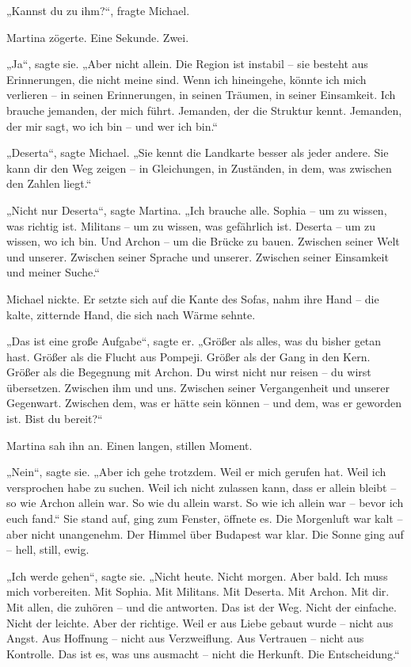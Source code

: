 \documentclass[
]{article}
\begin{document}
„Kannst du zu ihm?{\kern0pt}``, fragte Michael.

Martina zögerte. Eine Sekunde. Zwei.

„Ja``, sagte sie. „Aber nicht allein. Die Region ist instabil -- sie besteht aus Erinnerungen, die nicht meine sind. Wenn ich hineingehe, könnte ich mich verlieren -- in seinen Erinnerungen, in seinen Träumen, in seiner Einsamkeit. Ich brauche jemanden, der mich führt. Jemanden, der die Struktur kennt. Jemanden, der mir sagt, wo ich bin -- und wer ich bin.``

„Deserta``, sagte Michael. „Sie kennt die Landkarte besser als jeder andere. Sie kann dir den Weg zeigen -- in Gleichungen, in Zuständen, in dem, was zwischen den Zahlen liegt.``

„Nicht nur Deserta``, sagte Martina. „Ich brauche alle. Sophia -- um zu wissen, was richtig ist. Militans -- um zu wissen, was gefährlich ist. Deserta -- um zu wissen, wo ich bin. Und Archon -- um die Brücke zu bauen. Zwischen seiner Welt und unserer. Zwischen seiner Sprache und unserer. Zwischen seiner Einsamkeit und meiner Suche.``

Michael nickte. Er setzte sich auf die Kante des Sofas, nahm ihre Hand -- die kalte, zitternde Hand, die sich nach Wärme sehnte.

„Das ist eine große Aufgabe``, sagte er. „Größer als alles, was du bisher getan hast. Größer als die Flucht aus Pompeji. Größer als der Gang in den Kern. Größer als die Begegnung mit Archon. Du wirst nicht nur reisen -- du wirst übersetzen. Zwischen ihm und uns. Zwischen seiner Vergangenheit und unserer Gegenwart. Zwischen dem, was er hätte sein können -- und dem, was er geworden ist. Bist du bereit?{\kern0pt}``

Martina sah ihn an. Einen langen, stillen Moment.

„Nein``, sagte sie. „Aber ich gehe trotzdem. Weil er mich gerufen hat. Weil ich versprochen habe zu suchen. Weil ich nicht zulassen kann, dass er allein bleibt -- so wie Archon allein war. So wie du allein warst. So wie ich allein war -- bevor ich euch fand.`` Sie stand auf, ging zum Fenster, öffnete es. Die Morgenluft war kalt -- aber nicht unangenehm. Der Himmel über Budapest war klar. Die Sonne ging auf -- hell, still, ewig.

„Ich werde gehen``, sagte sie. „Nicht heute. Nicht morgen. Aber bald. Ich muss mich vorbereiten. Mit Sophia. Mit Militans. Mit Deserta. Mit Archon. Mit dir. Mit allen, die zuhören -- und die antworten. Das ist der Weg. Nicht der einfache. Nicht der leichte. Aber der richtige. Weil er aus Liebe gebaut wurde -- nicht aus Angst. Aus Hoffnung -- nicht aus Verzweiflung. Aus Vertrauen -- nicht aus Kontrolle. Das ist es, was uns ausmacht -- nicht die Herkunft. Die Entscheidung.``
\end{document}
